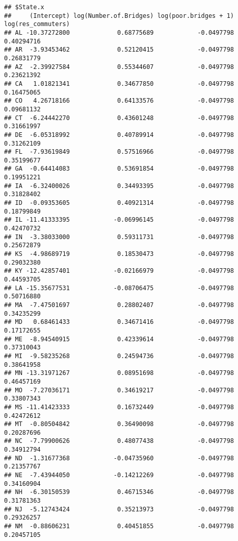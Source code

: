 \documentclass[
]{article}
\begin{document}
\begin{verbatim}
## $State.x
##     (Intercept) log(Number.of.Bridges) log(poor.bridges + 1) log(res_commuters)
## AL -10.37272800             0.68775689            -0.0497798         0.40294716
## AR  -3.93453462             0.52120415            -0.0497798         0.26831779
## AZ  -2.39927584             0.55344607            -0.0497798         0.23621392
## CA   1.01821341             0.34677850            -0.0497798         0.16475065
## CO   4.26718166             0.64133576            -0.0497798         0.09681132
## CT  -6.24442270             0.43601248            -0.0497798         0.31661997
## DE  -6.05318992             0.40789914            -0.0497798         0.31262109
## FL  -7.93619849             0.57516966            -0.0497798         0.35199677
## GA  -0.64414083             0.53691854            -0.0497798         0.19951221
## IA  -6.32400026             0.34493395            -0.0497798         0.31828402
## ID  -0.09353605             0.40921314            -0.0497798         0.18799849
## IL -11.41333395            -0.06996145            -0.0497798         0.42470732
## IN  -3.38033000             0.59311731            -0.0497798         0.25672879
## KS  -4.98689719             0.18530473            -0.0497798         0.29032380
## KY -12.42857401            -0.02166979            -0.0497798         0.44593705
## LA -15.35677531            -0.08706475            -0.0497798         0.50716880
## MA  -7.47501697             0.28802407            -0.0497798         0.34235299
## MD   0.68461433             0.34671416            -0.0497798         0.17172655
## ME  -8.94540915             0.42339614            -0.0497798         0.37310043
## MI  -9.58235268             0.24594736            -0.0497798         0.38641958
## MN -13.31971267             0.08951698            -0.0497798         0.46457169
## MO  -7.27036171             0.34619217            -0.0497798         0.33807343
## MS -11.41423333             0.16732449            -0.0497798         0.42472612
## MT  -0.80504842             0.36490098            -0.0497798         0.20287696
## NC  -7.79900626             0.48077438            -0.0497798         0.34912794
## ND  -1.31677368            -0.04735960            -0.0497798         0.21357767
## NE  -7.43944050            -0.14212269            -0.0497798         0.34160904
## NH  -6.30150539             0.46715346            -0.0497798         0.31781363
## NJ  -5.12743424             0.35213973            -0.0497798         0.29326257
## NM  -0.88606231             0.40451855            -0.0497798         0.20457105

\end{verbatim}
\end{document}
